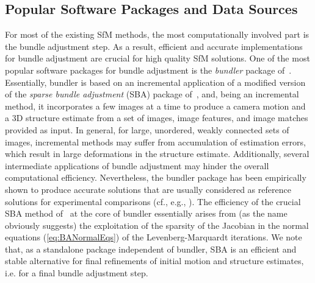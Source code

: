 \documentclass[10pt]{article}
\begin{document}
\subsection{Popular Software Packages and Data Sources}
For most of the existing SfM methods, the most computationally involved part is the bundle adjustment step. As a result, efficient and accurate implementations for bundle adjustment are crucial for high quality SfM solutions. One of the most popular software packages for bundle adjustment is the \textit{bundler} package of~\cite{SnavelyData}. Essentially, bundler is based on an incremental application of a modified version of the \textit{sparse bundle adjustment} (SBA) package of~\cite{SBA}, and, being an incremental method, it incorporates a few images at a time to produce a camera motion and a $3$D structure estimate from a set of images, image features, and image matches provided as input. In general, for large, unordered, weakly connected sets of images, incremental methods may suffer from accumulation of estimation errors, which result in large deformations in the structure estimate. Additionally, several intermediate applications of bundle adjustment may hinder the overall computational efficiency. Nevertheless, the bundler package has been empirically shown to produce accurate solutions that are usually considered as reference solutions for experimental comparisons (cf., e.g., \cite{LUD,Snavely1D}). The efficiency of the crucial SBA method of~\cite{SBA} at the core of bundler essentially arises from (as the name obviously suggests) the exploitation of the sparsity of the Jacobian in the normal equations (\ref{eq:BANormalEqs}) of the Levenberg-Marquardt iterations. We note that, as a standalone package independent of bundler, SBA is an efficient and stable alternative for final refinements of initial motion and structure estimates, i.e. for a final bundle adjustment step. 
\end{document}
